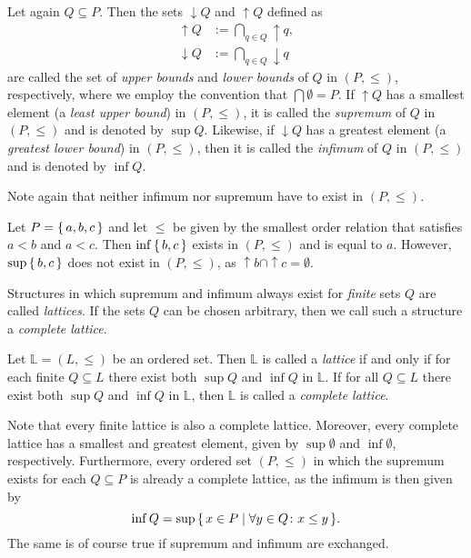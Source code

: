Let again $Q \subseteq P$.  Then the sets ${\downarrow} Q$ and ${\uparrow} Q$ defined as
\begin{align*}
  {\uparrow} Q &:= \bigcap_{q \in Q} {\uparrow} q,\\
  {\downarrow} Q &:= \bigcap_{q \in Q} {\downarrow} q
\end{align*}
are called the set of \emph{upper bounds} and \emph{lower bounds} of $Q$ in $(P, \le)$,
respectively, where we employ the convention that $\bigcap \emptyset = P$.  If ${\uparrow}
Q$ has a smallest element (a \emph{least upper bound}) in $(P, \le)$, it is called the
\emph{supremum} of $Q$ in $(P, \le)$ and is denoted by $\sup Q$.  Likewise, if
${\downarrow} Q$ has a greatest element (a \emph{greatest lower bound}) in $(P, \le)$,
then it is called the \emph{infimum} of $Q$ in $(P, \le)$ and is denoted by $\inf Q$.

Note again that neither infimum nor supremum have to exist in $(P, \le)$.

\begin{Example}
  \label{expl:3}
  Let $P = {\{\, a, b, c \,\}}$ and let $\le$ be given by the smallest order relation that
  satisfies $a < b$ and $a < c$.  Then $\inf{\ensuremath{\{\,b,c\,\}}}$ exists in $(P, \le)$ and is equal
  to $a$.  However, $\sup{\ensuremath{\{\,b, c\,\}}}$ does not exist in $(P, \le)$, as ${\uparrow} b \cap
  {\uparrow} c = \emptyset$.
\end{Example}

\noindent%
Structures in which supremum and infimum always exist for \emph{finite} sets $Q$ are
called \emph{lattices}.  If the sets $Q$ can be chosen arbitrary, then we call such a
structure a \emph{complete lattice}.

\begin{Definition}[Lattice]
  \label{def:lattice}
  Let $\mathbb L = (L, \le)$ be an ordered set.  Then $\mathbb L$ is called a
  \emph{lattice} if and only if for each finite $Q \subseteq L$ there exist both $\sup Q$
  and $\inf Q$ in $\mathbb L$.  If for all $Q \subseteq L$ there exist both $\sup Q$ and
  $\inf Q$ in $\mathbb L$, then $\mathbb L$ is called a \emph{complete lattice}.
\end{Definition}

\noindent%
Note that every finite lattice is also a complete lattice.  Moreover, every complete
lattice has a smallest and greatest element, given by $\sup\emptyset$ and $\inf\emptyset$,
respectively.  Furthermore, every ordered set $(P, \le)$ in which the supremum exists for
each $Q \subseteq P$ is already a complete lattice, as the infimum is then given by
\begin{equation*}
  \inf Q = \sup{\ensuremath{\{\, x \in P \mid \forall y \in Q \colon x \le y \,\}}}.
\end{equation*}
The same is of course true if supremum and infimum are exchanged.

